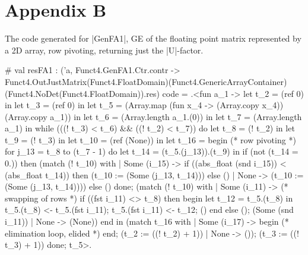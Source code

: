 \documentclass[draft]{elsart}
\begin{document}
\section{Appendix B}
The code generated for |GenFA1|, GE of the floating point matrix
represented by a 2D array, row pivoting, returning just the |U|-factor.
\begin{code2}
# val resFA1 : ('a,
   Funct4.GenFA1.Ctr.contr ->
   Funct4.OutJustMatrix(Funct4.FloatDomain)(Funct4.GenericArrayContainer)
                       (Funct4.NoDet(Funct4.FloatDomain)).res) code =
  .<fun a_1 ->
   let t_2 = (ref 0) in let t_3 = (ref 0) in
   let t_5 = (Array.map (fun x_4 -> (Array.copy x_4)) (Array.copy a_1)) in
   let t_6 = (Array.length a_1.(0)) in
   let t_7 = (Array.length a_1) in
   while (((! t_3) < t_6) && ((! t_2) < t_7)) do
    let t_8 = (! t_2) in let t_9 = (! t_3) in
    let t_10 = (ref (None)) in
    let t_16 =
     begin  (* row pivoting *)
      for j_13 = t_8 to (t_7 - 1) do
       let t_14 = (t_5.(j_13)).(t_9) in
       if (not (t_14 = 0.)) then
        (match (! t_10) with
         | Some (i_15) ->
            if ((abs_float (snd i_15)) < (abs_float t_14)) then
             (t_10 := (Some (j_13, t_14)))
            else ()
         | None -> (t_10 := (Some (j_13, t_14))))
       else ()
      done;
      (match (! t_10) with
       | Some (i_11) -> (* swapping of rows *)
          if ((fst i_11) <> t_8) then begin
           let t_12 = t_5.(t_8) in
           t_5.(t_8) <- t_5.(fst i_11);
           t_5.(fst i_11) <- t_12; () end else ();
          (Some (snd i_11))
       | None -> (None))
     end in
    (match t_16 with
     | Some (i_17) ->
        begin (* elimination loop, elided *) end;
        (t_2 := ((! t_2) + 1))
     | None -> ());
    (t_3 := ((! t_3) + 1))
   done;
   t_5>.
\end{code2}
\end{document}
